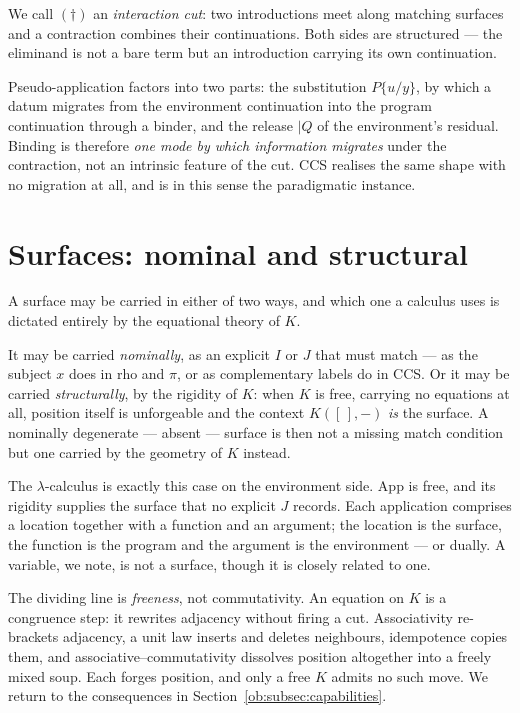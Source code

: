 We call $(\dagger)$ an \emph{interaction cut}: two introductions meet along matching
surfaces and a contraction combines their continuations. Both sides are structured ---
the eliminand is not a bare term but an introduction carrying its own continuation.

\begin{remark}
Pseudo-application factors into two parts: the substitution $P\{u/y\}$, by which a
datum migrates from the environment continuation into the program continuation through
a binder, and the release $\mid Q$ of the environment's residual. Binding is therefore
\emph{one mode by which information migrates} under the contraction, not an intrinsic
feature of the cut. CCS realises the same shape with no migration at all, and is in this
sense the paradigmatic instance.
\end{remark}

\section{Surfaces: nominal and structural}
\label{ob:subsec:surfaces}

A surface may be carried in either of two ways, and which one a calculus uses is
dictated entirely by the equational theory of $K$.

It may be carried \emph{nominally}, as an explicit $I$ or $J$ that must match --- as the
subject $x$ does in rho and $\pi$, or as complementary labels do in CCS. Or it may be
carried \emph{structurally}, by the rigidity of $K$: when $K$ is free, carrying no
equations at all, position itself is unforgeable and the context $K([\,],-)$ \emph{is}
the surface. A nominally degenerate --- absent --- surface is then not a missing match
condition but one carried by the geometry of $K$ instead.

The $\lambda$-calculus is exactly this case on the environment side. $\mathrm{App}$ is
free, and its rigidity supplies the surface that no explicit $J$ records. Each
application comprises a location together with a function and an argument; the location
is the surface, the function is the program and the argument is the environment --- or
dually. A variable, we note, is not a surface, though it is closely related to one.

The dividing line is \emph{freeness}, not commutativity. An equation on $K$ is a
congruence step: it rewrites adjacency without firing a cut. Associativity re-brackets
adjacency, a unit law inserts and deletes neighbours, idempotence copies them, and
associative--commutativity dissolves position altogether into a freely mixed soup. Each
forges position, and only a free $K$ admits no such move. We return to the consequences
in Section~\ref{ob:subsec:capabilities}.

